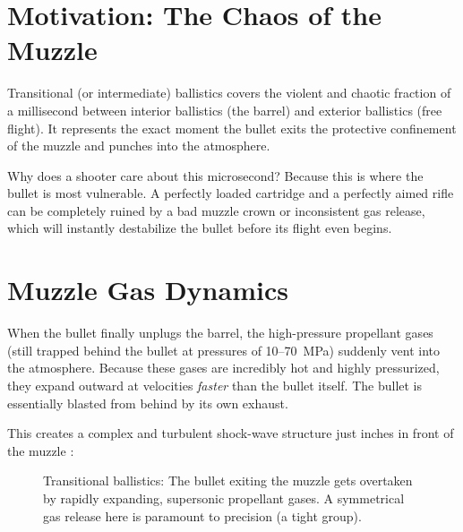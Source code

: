 \documentclass[11pt,twoside,openright]{report}
\begin{document}
\section{Motivation: The Chaos of the Muzzle}

Transitional (or intermediate) ballistics covers the violent and chaotic fraction of a millisecond between interior ballistics (the barrel) and exterior ballistics (free flight). It represents the exact moment the bullet exits the protective confinement of the muzzle and punches into the atmosphere.

Why does a shooter care about this microsecond? Because this is where the bullet is most vulnerable. A perfectly loaded cartridge and a perfectly aimed rifle can be completely ruined by a bad muzzle crown or inconsistent gas release, which will instantly destabilize the bullet before its flight even begins. 

\section{Muzzle Gas Dynamics}

When the bullet finally unplugs the barrel, the high-pressure propellant gases (still trapped behind the bullet at pressures of \SI{10}{}--\SI{70}{\mega\pascal}) suddenly vent into the atmosphere. Because these gases are incredibly hot and highly pressurized, they expand outward at velocities \emph{faster} than the bullet itself. The bullet is essentially blasted from behind by its own exhaust.

This creates a complex and turbulent shock-wave structure just inches in front of the muzzle \citep{carlucci2007ballistics}:

\begin{figure}[H]
\centering
{}
\caption{Transitional ballistics: The bullet exiting the muzzle gets overtaken by rapidly expanding, supersonic propellant gases. A symmetrical gas release here is paramount to precision (a tight group).}
\label{fig:muzzle_gas}
\end{figure}
\end{document}

